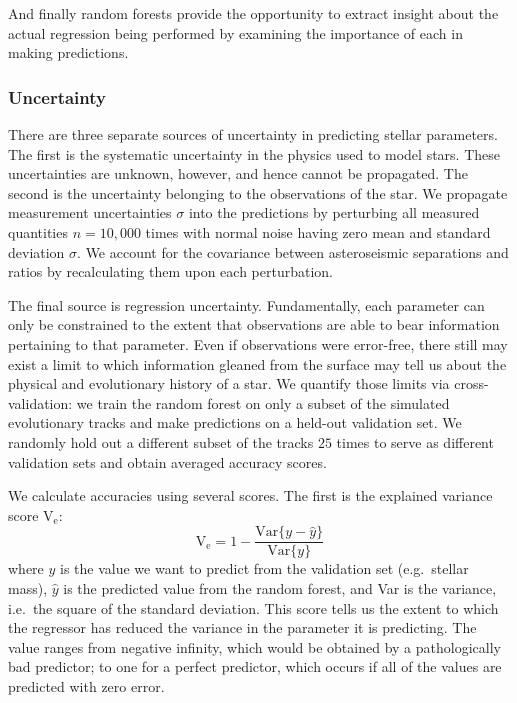 And finally random forests provide the opportunity to extract insight about the actual regression being performed by examining the importance of each  in making predictions. 

\subsubsection*{Uncertainty}
\label{sec:uncertainties}
There are three separate sources of uncertainty in predicting stellar parameters. The first is the systematic uncertainty in the physics used to model stars. These uncertainties are unknown, however, and hence cannot be propagated. The second is the uncertainty belonging to the observations of the star. We propagate measurement uncertainties $\sigma$ into the predictions by perturbing all measured quantities ${n=10,000}$ times with normal noise having zero mean and standard deviation $\sigma$. We account for the covariance between asteroseismic separations and ratios by recalculating them upon each perturbation. 

The final source is regression uncertainty. Fundamentally, each parameter can only be constrained to the extent that observations are able to bear information pertaining to that parameter. Even if observations were error-free, there still may exist a limit to which information gleaned from the surface may tell us about the physical  and evolutionary history of a star. We quantify those limits via cross-validation: we train the random forest on only a subset of the simulated evolutionary tracks and make predictions on a held-out validation set. We randomly hold out a different subset of the tracks $25$ times to serve as different validation sets and obtain averaged accuracy scores.

We calculate accuracies using several scores. The first is the explained variance score V$_{\text{e}}$:
\begin{equation}
  \text{V}_{\text{e}} = 1 - \frac{\text{Var}\{ y - \hat y \}}{\text{Var}\{ y \}}
\end{equation}
where $y$ is the  value we want to predict from the validation set (e.g.\ stellar mass), $\hat y$ is the predicted value from the random forest, and Var is the variance, i.e.\ the square of the standard deviation. This score tells us the extent to which the regressor has reduced the variance in the parameter it is predicting. The value ranges from negative infinity, which would be obtained by a pathologically bad predictor; to one for a perfect predictor, which occurs if all of the values are predicted with zero error. 

